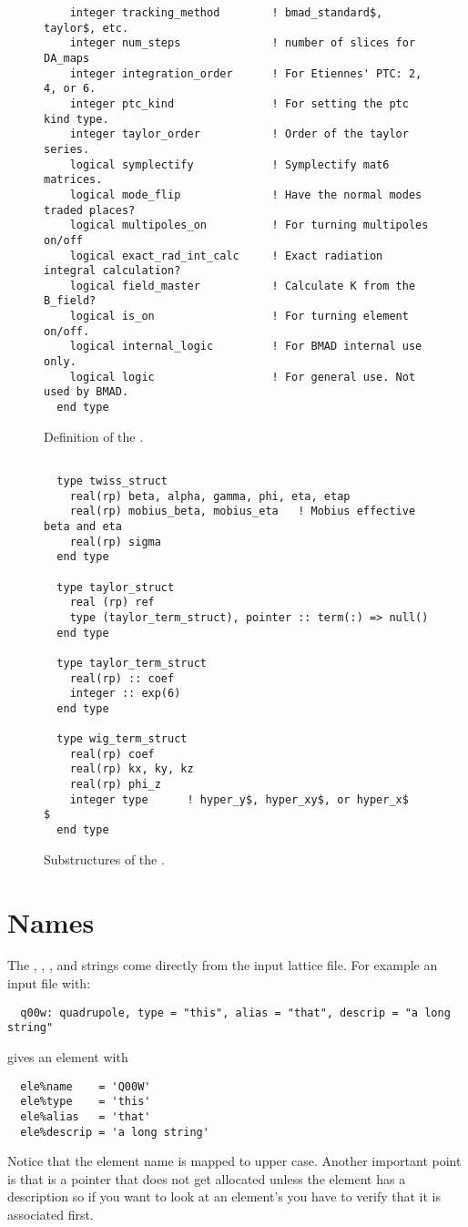 \begin{figure}[tb]
\begin{verbatim}
    integer tracking_method        ! bmad_standard$, taylor$, etc.
    integer num_steps              ! number of slices for DA_maps
    integer integration_order      ! For Etiennes' PTC: 2, 4, or 6.
    integer ptc_kind               ! For setting the ptc kind type.
    integer taylor_order           ! Order of the taylor series.
    logical symplectify            ! Symplectify mat6 matrices.
    logical mode_flip              ! Have the normal modes traded places?
    logical multipoles_on          ! For turning multipoles on/off
    logical exact_rad_int_calc     ! Exact radiation integral calculation?
    logical field_master           ! Calculate K from the B_field?
    logical is_on                  ! For turning element on/off.
    logical internal_logic         ! For BMAD internal use only.
    logical logic                  ! For general use. Not used by BMAD.
  end type
\end{verbatim}
\caption{Definition of the \elestruct.}
\label{f:ele_struct}
\end{figure}

\begin{figure}[tb]
\centering
\begin{verbatim}

  type twiss_struct
    real(rp) beta, alpha, gamma, phi, eta, etap
    real(rp) mobius_beta, mobius_eta   ! Mobius effective beta and eta
    real(rp) sigma
  end type

  type taylor_struct
    real (rp) ref
    type (taylor_term_struct), pointer :: term(:) => null()
  end type

  type taylor_term_struct
    real(rp) :: coef
    integer :: exp(6)
  end type

  type wig_term_struct
    real(rp) coef
    real(rp) kx, ky, kz
    real(rp) phi_z
    integer type      ! hyper_y$, hyper_xy$, or hyper_x$     $
  end type

\end{verbatim}
\caption{Substructures of the \elestruct.}
\label{f:subele_struct}
\end{figure}

\section{Names}

The , , , and  strings come directly
from the input lattice file. For example an input file with:
\begin{verbatim}
  q00w: quadrupole, type = "this", alias = "that", descrip = "a long string"
\end{verbatim}
gives an element with
\begin{verbatim}
  ele%name    = 'Q00W'
  ele%type    = 'this'
  ele%alias   = 'that'
  ele%descrip = 'a long string'
\end{verbatim}
Notice that the element name is mapped to upper case. Another
important point is that  is a pointer that does not get
allocated unless the element has a description so if you want to look
at an element's  you have to verify that it is associated
first.

